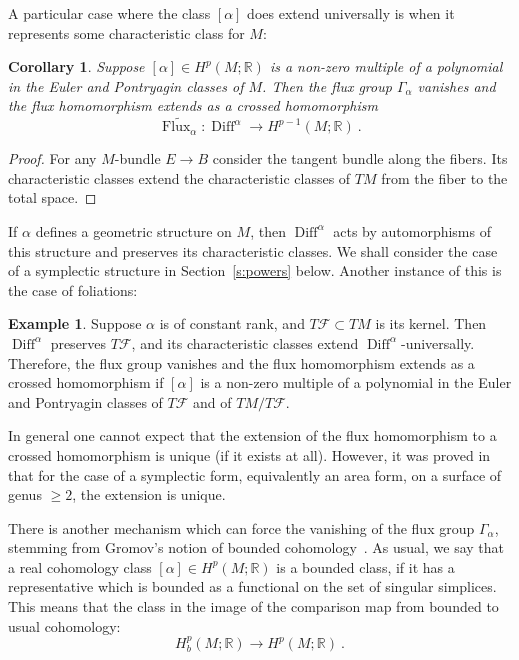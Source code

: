 \documentclass[12pt]{amsart}
\newtheorem{corollary}[theorem]{Corollary}
\theoremstyle{definition}
\newtheorem{example}[theorem]{Example}
\theoremstyle{remark}
\newcommand{\FF}{\mathcal{ F}}
\def\bR{{\mathbb R}}
\newcommand\Flux{\operatorname{Flux}}
\newcommand\Diff{\operatorname{Diff}}
\begin{document}
A particular case where the class $[\alpha]$ does extend universally 
is when it represents some characteristic class for $M$:
\begin{corollary}\label{c:main}
    Suppose $[\alpha]\in H^{p}(M;\bR)$ is a non-zero multiple of a 
    polynomial in the Euler and Pontryagin classes of $M$. Then the 
    flux group $\Gamma_{\alpha}$ vanishes and the flux homomorphism 
    extends as a crossed homomorphism
    $$
    \widetilde{\Flux_{\alpha}}\colon\Diff^{\alpha}\longrightarrow H^{p-1}(M;\bR) \ .
    $$
    \end{corollary}
\begin{proof}
    For any $M$-bundle $E\rightarrow B$ consider the tangent bundle 
    along the fibers. Its characteristic classes extend the 
    characteristic classes of $TM$ from the fiber to the total space.
    \end{proof}

If $\alpha$ defines a geometric structure on $M$, then $\Diff^{\alpha}$ 
acts by automorphisms of this structure and preserves its characteristic 
classes. We shall consider the case of a symplectic structure in 
Section~\ref{s:powers} below. Another instance of this is the case of foliations:
\begin{example}
    Suppose $\alpha$ is of constant rank, and $T\FF\subset TM$ is its 
    kernel. Then $\Diff^{\alpha}$ preserves $T\FF$, and its 
    characteristic classes extend $\Diff^{\alpha}$-universally. 
    Therefore, the flux group vanishes and the flux homomorphism 
    extends as a crossed homomorphism if $[\alpha]$ is a non-zero 
    multiple of a polynomial in the Euler and Pontryagin classes of 
    $T\FF$ and of $TM/T\FF$.
    \end{example}

In general one cannot expect that the extension of the flux homomorphism to
a crossed homomorphism is unique (if it exists at all). However, it was proved in~\cite{KM}
that for the case of a symplectic form, equivalently an area form, on a surface of
genus $\geq 2$, the extension is unique.

There is another mechanism which can force the vanishing of the flux group $\Gamma_{\alpha}$, 
stemming from Gromov's notion of bounded cohomology~\cite{Gromov}. As usual, we say that a 
real cohomology class $[\alpha]\in H^p(M;\bR)$ is a bounded class, if it has a representative which 
is bounded as a functional on the set of singular simplices. This means that the class in the image 
of the comparison map from bounded to usual cohomology:
$$
H^p_b(M;\bR)\longrightarrow H^p(M;\bR) \ .
$$
    
\end{document}
